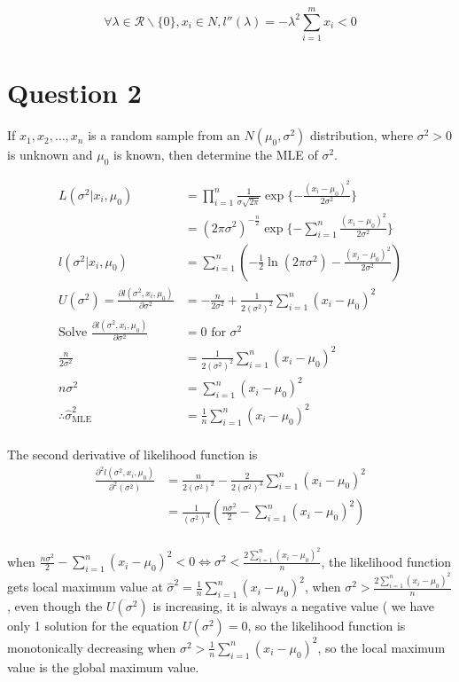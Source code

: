\documentclass[11pt]{article}
\newcommand{\prob}[1]{
\begin{tcolorbox}[colback=green!5!white,colframe=green!75!black]
#1
\end{tcolorbox}
}
\begin{document}
\[
\forall \lambda \in \mathcal{R}\backslash\{0\}, x_{i} \in N,  l''(\lambda)= -\lambda^{2}\sum_{i=1}^{m} x_{i} < 0
\] 

\section{Question 2}
\prob{
If $x_1,x_2,\ldots,x_{n}$ is a random sample from an $N(\mu_0, \sigma^{2})$ distribution, where $\sigma^{2}>0$ is unknown and $\mu_0$ is known, then determine the MLE of $\sigma^2$.
}

\begin{align*}
L\left( \sigma^2|x_{i}, \mu_0 \right) &= \prod_{i=1}^{n}\frac{1}{\sigma\sqrt{2\pi}}\exp{\{-\frac{\left( x_i-\mu_0 \right)^{2}}{2\sigma^2} \}}\\
				      &= (2\pi\sigma^2)^{-\frac{n}{2}}\exp{\{-\sum_{i=1}^{n}\frac{\left( x_i-\mu_0 \right)^{2}}{2\sigma^2} \}}\\
l\left( \sigma^2|x_{i}, \mu_0 \right) &= \sum_{i=1}^{n} \left(  -\frac{1}{2}\ln(2\pi\sigma^2 )-\frac{\left( x_i-\mu_0 \right)^{2}}{2\sigma^2} \right) \\
U\left( \sigma^2 \right)  = \frac{\partial l(\sigma^2,x_{i},\mu_0)}{\partial \sigma^2}
&=-\frac{n}{2\sigma^2}+\frac{1}{2(\sigma^2)^2}\sum_{i=1}^{n}(x_i-\mu_0)^2\\
\text{Solve }\frac{\partial l(\sigma^2,x_{i},\mu_0)}{\partial \sigma^2} &= 0 \text{ for $\sigma^2$}\\
\frac{n}{2\sigma^2}&=\frac{1}{2(\sigma^2)^2}\sum_{i=1}^{n}(x_i-\mu_0)^2\\
{n}{\sigma^2}&=\sum_{i=1}^{n}(x_i-\mu_0)^2\\
\therefore\hat{\sigma}_{\text{MLE}}^2&=\frac{1}{n}\sum_{i=1}^{n}(x_i-\mu_0)^2\\
\end{align*}

The second derivative of likelihood function is
\begin{align*}
\frac{\partial^2 l(\sigma^2,x_{i},\mu_0)}{\partial^2 (\sigma^2)}
&=\frac{n}{2(\sigma^2)^2}-\frac{2}{2(\sigma^2)^3}\sum_{i=1}^{n}(x_i-\mu_0)^2\\
&=\frac{1}{(\sigma^2)^3}(\frac{n\sigma^2}{2}-\sum_{i=1}^{n}(x_i-\mu_0)^2)\\
\end{align*}

when $\frac{n\sigma^2}{2}-\sum_{i=1}^{n}(x_i-\mu_0)^2 < 0 \Leftrightarrow \sigma^2<\frac{2\sum_{i=1}^{n}(x_i-\mu_0)^2}{n}$, the likelihood function gets local maximum value at $\hat{\sigma}^2=\frac{1}{n}\sum_{i=1}^{n}(x_i-\mu_0)^2$, when $\sigma^2>\frac{2\sum_{i=1}^{n}(x_i-\mu_0)^2}{n}$, even though the $U(\sigma^2)$ is increasing, it is always a negative value ( we have only 1 solution for the equation $U(\sigma^2) = 0$, so the likelihood function is monotonically decreasing when $\sigma^2 > \frac{1}{n}\sum_{i=1}^{n} \left( x_i-\mu_0 \right) ^2$, so the local maximum value is the global maximum value.
\end{document}
